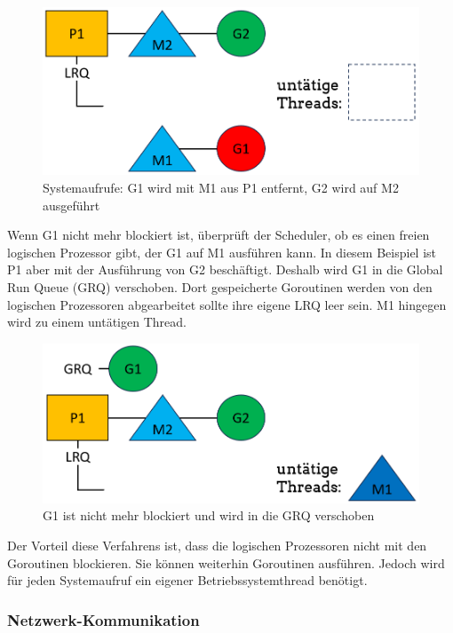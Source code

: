 \documentclass[fontsize=12pt,paper=a4,twoside=semi,parskip=half-,headsepline,headinclude]{scrreprt}
\begin{document}
\begin{figure}[h]
	\centering
	\includegraphics[scale=0.5]{figures/GoroutineSystemaufrufe2.png}
	\caption{Systemaufrufe: G1 wird mit M1 aus P1 entfernt, G2 wird auf M2 ausgeführt}
	\label{fig:GoroutineSystemaufrufe2}
\end{figure}

Wenn G1 nicht mehr blockiert ist, überprüft der Scheduler, ob es einen freien logischen Prozessor gibt, der G1 auf M1 ausführen kann. In diesem Beispiel ist P1 aber mit der Ausführung von G2 beschäftigt. Deshalb wird G1 in die Global Run Queue (GRQ) verschoben. Dort gespeicherte Goroutinen werden von den logischen Prozessoren abgearbeitet sollte ihre eigene LRQ leer sein. M1 hingegen wird zu einem untätigen Thread.

\begin{figure}[h]
	\centering
	\includegraphics[scale=0.5]{figures/GoroutineSystemaufrufe3.png}
	\caption{G1 ist nicht mehr blockiert und wird in die GRQ verschoben}
	\label{fig:GoroutineSystemaufrufe3}
\end{figure}

Der Vorteil diese Verfahrens ist, dass die logischen Prozessoren nicht mit den Goroutinen blockieren. Sie können weiterhin Goroutinen ausführen. Jedoch wird für jeden Systemaufruf ein eigener Betriebssystemthread benötigt.

\subsubsection{Netzwerk-Kommunikation}
\end{document}
